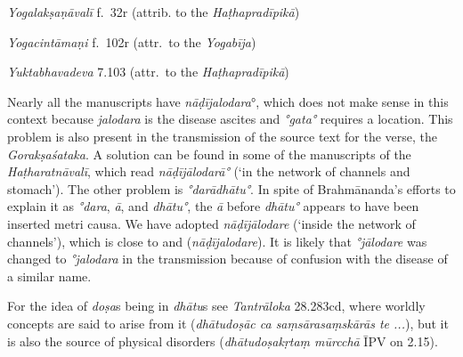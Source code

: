 \begin{ekdosis}
\begin{testimonia}[hp02_053]
\emph{Yogalakṣaṇāvalī} f.~32r (attrib. to the \emph{Haṭhapradīpikā})
\begin{versinnote}
\end{versinnote}

\emph{Yogacintāmaṇi} f.~102r (attr.~to the \emph{Yogabīja})

\begin{versinnote}
\end{versinnote}

\emph{Yuktabhavadeva} 7.103 (attr.~to the \emph{Haṭhapradīpikā})

\begin{versinnote} 
\end{versinnote}

\end{testimonia}

\begin{philcomm}[hp02_053]
Nearly all the manuscripts have \emph{nāḍījalodara}°, which does not make sense in this context because \emph{jalodara} is the disease ascites and \emph{°gata°} requires a location. This problem is also present in the transmission of the source text for the verse, the \emph{Gorakṣaśataka}. A solution can be found in some of the manuscripts of the \emph{Haṭharatnāvalī}, which read \emph{nāḍījālodarā°} (‘in the network of channels and stomach’). The other problem is \emph{°darādhātu°}. In spite of Brahmānanda’s efforts to explain it as \emph{°dara}, \emph{ā}, and \emph{dhātu°}, the \emph{ā} before \emph{dhātu°} appears to have been inserted metri causa. We have adopted \emph{nāḍījālodare} (‘inside the network of channels’), which is close to  and  (\emph{nāḍījalodare}). It is likely that \emph{°jālodare} was changed to \emph{°jalodara} in the transmission because of confusion with the disease of a similar name.

For the idea of \emph{doṣa}s being in \emph{dhātu}s see \emph{Tantrāloka} 28.283cd, where worldly concepts are said to arise from it (\emph{dhātudoṣāc ca saṃsārasaṃskārās te ...}), but it is also the source of physical disorders (\emph{dhātudoṣakṛtaṃ mūrcchā} ĪPV on 2.15).


\end{philcomm}
\end{ekdosis}
